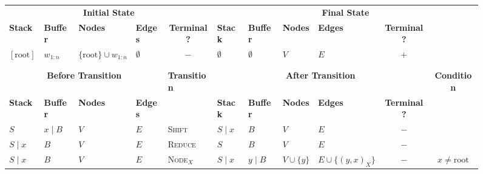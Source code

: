 \documentclass[11pt]{article}
\begin{document}
\begin{figure*}
\begin{adjustbox}{width=\textwidth,margin=3pt,frame}
\begin{tabular}{llll|l|llllc|c}
\multicolumn{5}{c|}{\textbf{\small Initial State}} & \multicolumn{6}{c}{\textbf{\small Final State}} \\
\textbf{\footnotesize Stack} & \textbf{\footnotesize Buffer} & \textbf{\footnotesize Nodes} & \multicolumn{1}{l}{\textbf{\footnotesize Edges}} & \multicolumn{1}{c|}{\textbf{\footnotesize Terminal?}} & \textbf{\footnotesize Stack} & \textbf{\footnotesize Buffer} & \textbf{\footnotesize Nodes} & \textbf{\footnotesize Edges} & \multicolumn{1}{c}{\textbf{\footnotesize Terminal?}} \\
$[\mathrm{root}]$ & $w_{1:n}$ & \multirow{2}{40pt}{$\{\mathrm{root}\} \cup w_{1:n}$} & \multicolumn{1}{l}{$\emptyset$} & \multicolumn{1}{c|}{$-$} & $\emptyset$ & $\emptyset$ & $V$ & $E$ & \multicolumn{1}{c}{$+$} \\ 
\multicolumn{5}{c|}{} \\
\multicolumn{5}{c|}{} \\
\hline
\multicolumn{4}{c|}{\textbf{\small Before Transition}} & \textbf{\small Transition} & \multicolumn{5}{c|}{\textbf{\small After Transition}} & \textbf{\small Condition} \\
\textbf{\footnotesize Stack} & \textbf{\footnotesize Buffer} & \textbf{\footnotesize Nodes} & \textbf{\footnotesize Edges} & & \textbf{\footnotesize Stack} & \textbf{\footnotesize Buffer} & \textbf{\footnotesize Nodes} & \textbf{\footnotesize Edges} & \textbf{\footnotesize Terminal?} & \\
$S$ & $x \;|\; B$ & $V$ & $E$ & \textsc{Shift} & $S \;|\; x$ & $B$ & $V$ & $E$ & $-$ & \\
$S \;|\; x$ & $B$ & $V$ & $E$ & \textsc{Reduce} & $S$ & $B$ & $V$ & $E$ & $-$ & \\
$S \;|\; x$ & $B$ & $V$ & $E$ & \textsc{Node$_X$} & $S \;|\; x$ & $y \;|\; B$ & $V \cup \{ y \}$ & $E \cup \{ (y,x)_X \}$ & $-$ &
$x \neq \mathrm{root}$ \\

\end{tabular}
\end{adjustbox}
\end{figure*}
\end{document}
